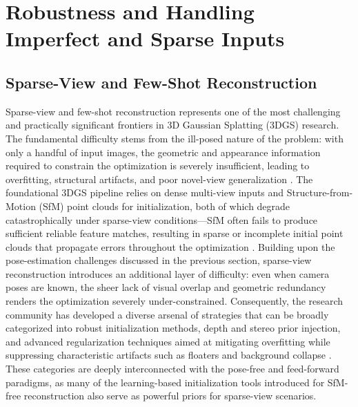 \documentclass[11pt]{article}
\begin{document}
\section{Robustness and Handling Imperfect and Sparse Inputs}

\subsection{Sparse-View and Few-Shot Reconstruction}

Sparse-view and few-shot reconstruction represents one of the most challenging and practically significant frontiers in 3D Gaussian Splatting (3DGS) research. The fundamental difficulty stems from the ill-posed nature of the problem: with only a handful of input images, the geometric and appearance information required to constrain the optimization is severely insufficient, leading to overfitting, structural artifacts, and poor novel-view generalization \cite{ref255}. The foundational 3DGS pipeline relies on dense multi-view inputs and Structure-from-Motion (SfM) point clouds for initialization, both of which degrade catastrophically under sparse-view conditions---SfM often fails to produce sufficient reliable feature matches, resulting in sparse or incomplete initial point clouds that propagate errors throughout the optimization \cite{ref256,ref257}. Building upon the pose-estimation challenges discussed in the previous section, sparse-view reconstruction introduces an additional layer of difficulty: even when camera poses are known, the sheer lack of visual overlap and geometric redundancy renders the optimization severely under-constrained. Consequently, the research community has developed a diverse arsenal of strategies that can be broadly categorized into robust initialization methods, depth and stereo prior injection, and advanced regularization techniques aimed at mitigating overfitting while suppressing characteristic artifacts such as floaters and background collapse \cite{ref258}. These categories are deeply interconnected with the pose-free and feed-forward paradigms, as many of the learning-based initialization tools introduced for SfM-free reconstruction also serve as powerful priors for sparse-view scenarios.
\end{document}
